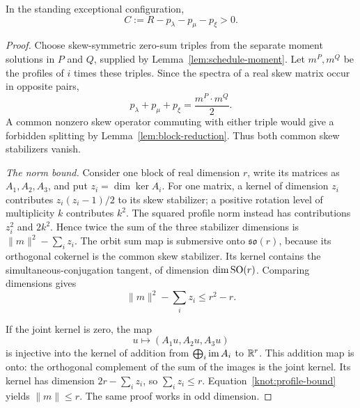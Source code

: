 \begin{proposition}\label{prop:strict-count}
In the standing exceptional configuration,
\begin{equation}\label{knot:strict-count}
 C:=R-p_\lambda-p_\mu-p_\xi>0.
\end{equation}
\end{proposition}

\begin{proof}
Choose skew-symmetric zero-sum triples from the separate moment
solutions in \(P\) and \(Q\), supplied by
Lemma~\ref{lem:schedule-moment}.  Let \(m^P,m^Q\) be the profiles of
\(i\) times these triples.  Since the spectra of a real skew matrix
occur in opposite pairs,
\begin{equation}\label{knot:profile-ties}
 p_\lambda+p_\mu+p_\xi=\frac{m^P\cdot m^Q}{2}.
\end{equation}
A common nonzero skew operator commuting with either triple would give
a forbidden splitting by Lemma~\ref{lem:block-reduction}.  Thus both
common skew stabilizers vanish.

\emph{The norm bound.}
Consider one block of real dimension \(r\), write its matrices as
\(A_1,A_2,A_3\), and put \(z_i=\dim\ker A_i\).  For one matrix, a
kernel of dimension \(z_i\) contributes \(z_i(z_i-1)/2\) to its skew
stabilizer; a positive rotation level of multiplicity \(k\) contributes
\(k^2\).  The squared profile norm instead has contributions \(z_i^2\)
and \(2k^2\).  Hence twice the sum of the three stabilizer dimensions
is \(\|m\|^2-\sum_i z_i\).  The orbit sum map is submersive onto
\(\mathfrak{so}(r)\), because its orthogonal cokernel is the common
skew stabilizer.  Its kernel contains the simultaneous-conjugation
tangent, of dimension \(\dim\operatorname{SO}(r)\).  Comparing dimensions gives
\begin{equation}\label{knot:profile-bound}
 \|m\|^2-\sum_i z_i\le r^2-r.
\end{equation}

If the joint kernel is zero, the map
\[
 u\longmapsto(A_1u,A_2u,A_3u)
\]
is injective into the kernel of addition from
\(\bigoplus_i\operatorname{im} A_i\) to \(\mathbb R^r\).  This addition map is onto:
the orthogonal complement of the sum of the images is the joint
kernel.  Its kernel has dimension \(2r-\sum_i z_i\), so
\(\sum_i z_i\le r\).  Equation~\eqref{knot:profile-bound} yields
\(\|m\|\le r\).  The same proof works in odd dimension.


\end{proof}
